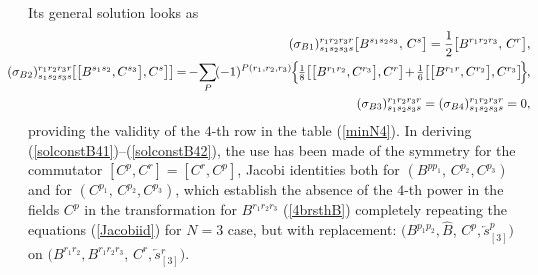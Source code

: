 \documentclass[10pt]{article}
\begin{document}
Its general  solution looks as
\begin{eqnarray}\label{solconstB41}
\hspace{-0.9em}  &\hspace{-0.9em}&\hspace{-0.9em} (\sigma_{B1})^{r_1r_2r_3r}_{s_1s_2s_3s} \big[B^{s_1s_2s_3},\,C^s\big] = \frac{1}{2} \big[B^{r_1r_2r_3},\,C^r\big], \\
\hspace{-0.9em}  &\hspace{-0.9em}&\hspace{-0.9em}
 (\sigma_{{B}2})^{r_1r_2r_3r}_{s_1s_2s_3s} \hspace{-0.1em}\big[\big[B^{s_1s_2},C^{s_3}\big],C^{s}\big]\big] \hspace{-0.1em} = \hspace{-0.1em} - \hspace{-0.15em} \displaystyle\sum_{P}\hspace{-0.15em}(-1)^{P(r_1,r_2,r_3)}\hspace{-0.1em}\Big\{\hspace{-0.1em}\textstyle\frac{1}{8}\big[\big[B^{r_1r_2},C^{r_3}\big],C^r\big] \hspace{-0.15em}+\hspace{-0.1em}\frac{1}{6} \big[\big[B^{r_1r},C^{r_2}\big],C^{r_3}\big]\hspace{-0.1em} \hspace{-0.1em}\Big\}\hspace{-0.1em},\label{solconstB423}\\
\hspace{-0.9em}  &\hspace{-0.9em}&\hspace{-0.9em} (\sigma_{{B}3})^{r_1r_2r_3r}_{s_1s_2s_3s} = (\sigma_{{B}4})^{r_1r_2r_3r}_{s_1s_2s_3s} =0 \label{solconstB42},
\end{eqnarray}
providing the validity of the $4$-th  row in the table (\ref{minN4}). In deriving (\ref{solconstB41})--(\ref{solconstB42}),
  the use has been made of the symmetry for the commutator $[C^p,C^r]=[C^r,C^p]$,  Jacobi identities both for $(B^{pp_1},\, C^{p_2},C^{p_3})$ and for  $(C^{p_1},\, C^{p_2}, C^{p_3})$, which establish the absence of the $4$-th power in the fields
$C^p$ in the transformation for ${B}^{r_1r_2r_3}$ (\ref{4brsthB}) completely repeating the equations (\ref{Jacobiid}) for $N=3$ case, but with replacement: $\big(B^{p_1p_2}, \widehat{B}$,  $C^{p},\overleftarrow{s}{}^{p}_{[3]}\big)$ on  $\big(B^{r_1r_2}, {B}^{r_1r_2r_3}$, $C^{r},\overleftarrow{s}{}^{r}_{[3]}\big)$.
\end{document}
